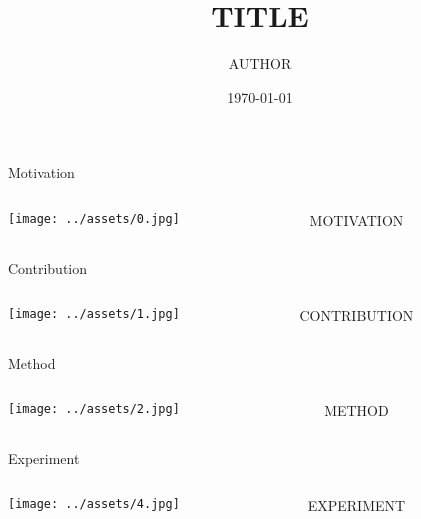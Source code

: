 \documentclass{beamer}
\title{TITLE}
\author{AUTHOR}
\date{\today}
\begin{document}
\begin{frame}
\titlepage
\end{frame}

\begin{frame}{Motivation}
\begin{columns}
    \begin{column}{.5\linewidth}
        \texttt{[image: ../assets/0.jpg]}
    \end{column}
    \begin{column}{.5\linewidth}
        \begin{itemize}
            MOTIVATION
        \end{itemize}
    \end{column}
\end{columns}
\end{frame}

\begin{frame}{Contribution}
\begin{columns}
    \begin{column}{.5\linewidth}
        \texttt{[image: ../assets/1.jpg]}
    \end{column}
    \begin{column}{.5\linewidth}
        \begin{itemize}
            CONTRIBUTION
        \end{itemize}
    \end{column}
\end{columns}
\end{frame}

\begin{frame}{Method}
\begin{columns}
    \begin{column}{.5\linewidth}
        \texttt{[image: ../assets/2.jpg]}
    \end{column}
    \begin{column}{.5\linewidth}
        \begin{itemize}
            METHOD
        \end{itemize}
    \end{column}
\end{columns}
\end{frame}

\begin{frame}{Experiment}
\begin{columns}
    \begin{column}{.5\linewidth}
        \texttt{[image: ../assets/4.jpg]}
    \end{column}
    \begin{column}{.5\linewidth}
        \begin{itemize}
            EXPERIMENT
        \end{itemize}
    \end{column}
\end{columns}
\end{frame}
\end{document}
